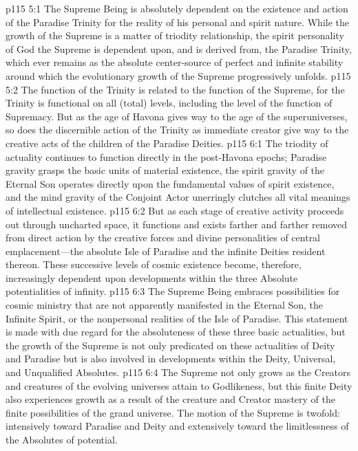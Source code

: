 \vs p115 5:1 The Supreme Being is absolutely dependent on the existence and action of the Paradise Trinity for the reality of his personal and spirit nature. While the growth of the Supreme is a matter of triodity relationship, the spirit personality of God the Supreme is dependent upon, and is derived from, the Paradise Trinity, which ever remains as the absolute center\hyp{}source of perfect and infinite stability around which the evolutionary growth of the Supreme progressively unfolds.
\vs p115 5:2 The function of the Trinity is related to the function of the Supreme, for the Trinity is functional on all (total) levels, including the level of the function of Supremacy. But as the age of Havona gives way to the age of the superuniverses, so does the discernible action of the Trinity as immediate creator give way to the creative acts of the children of the Paradise Deities.
\vs p115 6:1 The triodity of actuality continues to function directly in the post\hyp{}Havona epochs; Paradise gravity grasps the basic units of material existence, the spirit gravity of the Eternal Son operates directly upon the fundamental values of spirit existence, and the mind gravity of the Conjoint Actor unerringly clutches all vital meanings of intellectual existence.
\vs p115 6:2 But as each stage of creative activity proceeds out through uncharted space, it functions and exists farther and farther removed from direct action by the creative forces and divine personalities of central emplacement---the absolute Isle of Paradise and the infinite Deities resident thereon. These successive levels of cosmic existence become, therefore, increasingly dependent upon developments within the three Absolute potentialities of infinity.
\vs p115 6:3 The Supreme Being embraces possibilities for cosmic ministry that are not apparently manifested in the Eternal Son, the Infinite Spirit, or the nonpersonal realities of the Isle of Paradise. This statement is made with due regard for the absoluteness of these three basic actualities, but the growth of the Supreme is not only predicated on these actualities of Deity and Paradise but is also involved in developments within the Deity, Universal, and Unqualified Absolutes.
\pc \vs p115 6:4 The Supreme not only grows as the Creators and creatures of the evolving universes attain to Godlikeness, but this finite Deity also experiences growth as a result of the creature and Creator mastery of the finite possibilities of the grand universe. The motion of the Supreme is twofold: intensively toward Paradise and Deity and extensively toward the limitlessness of the Absolutes of potential.
